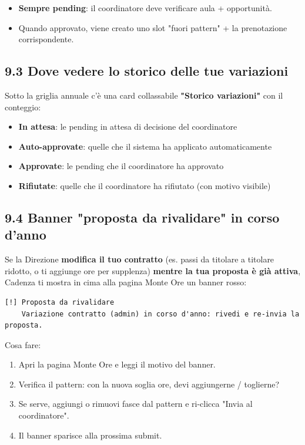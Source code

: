 \documentclass[11pt,a4paper]{article}
\begin{document}
\begin{itemize}
  \item \textbf{Sempre pending}: il coordinatore deve verificare aula + opportunità.
  \item Quando approvato, viene creato uno slot "fuori pattern" + la prenotazione corrispondente.
\end{itemize}

\subsection{9.3 Dove vedere lo storico delle tue variazioni}


Sotto la griglia annuale c'è una card collassabile \textbf{"Storico variazioni"} con il conteggio:

\begin{itemize}
  \item \textbf{In attesa}: le pending in attesa di decisione del coordinatore
  \item \textbf{Auto-approvate}: quelle che il sistema ha applicato automaticamente
  \item \textbf{Approvate}: le pending che il coordinatore ha approvato
  \item \textbf{Rifiutate}: quelle che il coordinatore ha rifiutato (con motivo visibile)
\end{itemize}

\subsection{9.4 Banner "proposta da rivalidare" in corso d'anno}


Se la Direzione \textbf{modifica il tuo contratto} (es. passi da titolare a titolare ridotto, o ti aggiunge ore per supplenza) \textbf{mentre la tua proposta è già attiva}, Cadenza ti mostra in cima alla pagina Monte Ore un banner rosso:

\begin{lstlisting}
[!] Proposta da rivalidare
    Variazione contratto (admin) in corso d'anno: rivedi e re-invia la proposta.
\end{lstlisting}

Cosa fare:

\begin{enumerate}
  \item Apri la pagina Monte Ore e leggi il motivo del banner.
  \item Verifica il pattern: con la nuova soglia ore, devi aggiungerne / toglierne?
  \item Se serve, aggiungi o rimuovi fasce dal pattern e ri-clicca "Invia al coordinatore".
  \item Il banner sparisce alla prossima submit.
\end{enumerate}
\end{document}
